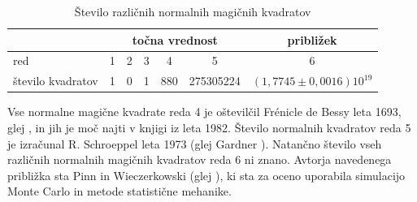 \documentclass[a4paper,12pt]{article}
\begin{document}

   
   
   \begin{table}[!ht]
      \centering
      \caption{Število različnih normalnih magičnih kvadratov}
      \begin{tabular}{lcccccc}\toprule
            &\multicolumn{5}{c}{točna vrednost} & približek\\\midrule
            red & 1 & 2 & 3 & 4 & 5 & 6\\
            število kvadratov & 1 & 0 & 1 & 880 & 275305224 & \((1{,}7745\pm 0{,}0016)10^{19}\)\\
            \bottomrule
      \end{tabular}
      \label{table:stevila}
   \end{table}

Vse normalne magične kvadrate reda 4 je oštevilčil Frénicle de Bessy
leta 1693, glej \cite{bessy}, in jih je moč najti v knjigi \cite{berlekamp}
iz leta 1982. Število normalnih kvadratov reda 5 je izračunal
R. Schroeppel leta 1973 (glej Gardner \cite{gardner}).
Natančno število vseh različnih normalnih magičnih kvadratov reda 6 ni znano.
Avtorja navedenega približka sta Pinn in Wieczerkowski (glej \cite{pinn}), ki
sta za oceno uporabila simulacijo Monte Carlo in metode statistične mehanike.


\newpage




\end{document}
